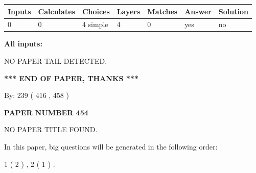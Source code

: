 \documentclass[12pt]{article}
\begin{document}
 
   
   
   
   
\noindent\begin{tabular}{|l|l|l|l|l|l|l|}
 \hline
Inputs & Calculates & Choices & Layers & Matches & Answer & Solution \\ \hline
 0  & 
 0  & 
 4
  simple  
  & 
 4  & 
 0  & 
  yes & 
  no 
  \\ \hline
 \end{tabular}
   
   
   
   
\noindent{}
   
   
   
   
\noindent\vspace{0.1in}\hspace{-0.08in} {\textbf{\Large{All inputs: }}}
   
   
   
   
\vspace{2.0in} NO PAPER TAIL DETECTED.
   
   
   
   
\vspace{1.0in} 
{\textbf{\large{ *** END OF PAPER, THANKS *** }}} 
   
   
\hspace{1.0in} By: 
 239 ( 416 ,  458 )
   
   
   
   
\newpage 
\setcounter{page}{ 
   454001 } 
   
   
   
   
 {\textbf{ \Large{ PAPER NUMBER  454  }}}
   
   
\vspace{0.2in}
   
   
   
   
   
   
 NO PAPER TITLE FOUND.
   
   
   
\vspace{0.2in}
   
In this paper, big questions will be generated in the following order: 
   
   
   1 ( 2 )
 ,
   2 ( 1 )
 .
  
\vspace{0.2in}
  
\end{document}
